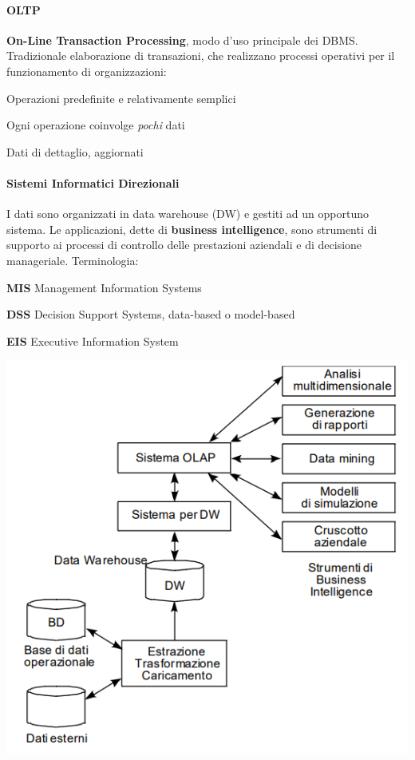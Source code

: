 \documentclass[10pt]{book}
\begin{document}
\begin{multicols}{2}
\paragraph{OLTP} \textbf{On-Line Transaction Processing}, modo d'uso principale dei DBMS. Tradizionale elaborazione di transazioni, che realizzano processi operativi per il funzionamento di organizzazioni:
\begin{list}{}{}
	\item Operazioni predefinite e relativamente semplici
	\item Ogni operazione coinvolge \textit{pochi} dati
	\item Dati di dettaglio, aggiornati
\end{list}
\end{multicols}
\begin{multicols}{2}
\paragraph{Sistemi Informatici Direzionali} I dati sono organizzati in data warehouse (DW) e gestiti ad un opportuno sistema. Le applicazioni, dette di \textbf{business intelligence}, sono strumenti di supporto ai processi di controllo delle prestazioni aziendali e di decisione manageriale. Terminologia:
\begin{list}{}{}
	\item \textbf{MIS} Management Information Systems
	\item \textbf{DSS} Decision Support Systems, data-based o model-based
	\item \textbf{EIS} Executive Information System
\end{list}
\begin{center}
	\includegraphics[scale=0.6]{sisinfdir.png}
\end{center}
\columnbreak

\end{multicols}
\end{document}
